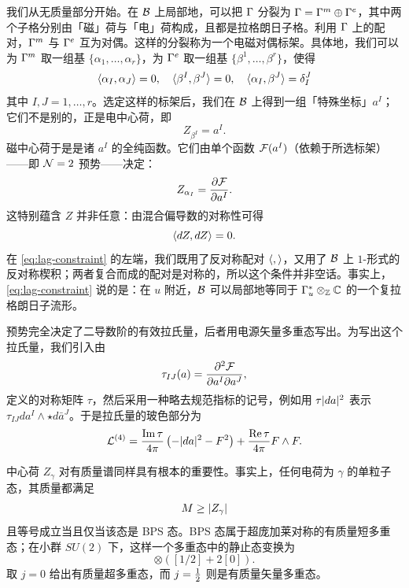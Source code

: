 我们从无质量部分开始。在 $\mathcal{B}$ 上局部地，可以把 $\Gamma$ 分裂为 $\Gamma = \Gamma^m \oplus \Gamma^e$，其中两个子格分别由「磁」荷与「电」荷构成，且都是拉格朗日子格。利用 $\Gamma$ 上的配对，$\Gamma^m$ 与 $\Gamma^e$ 互为对偶。这样的分裂称为一个电磁对偶标架。具体地，我们可以为 $\Gamma^m$ 取一组基 $\{\alpha_1, \dots, \alpha_r\}$，为 $\Gamma^e$ 取一组基 $\{\beta^1, \dots, \beta^r\}$，使得
\begin{equation}
\langle \alpha_I, \alpha_J \rangle = 0, \quad \langle \beta^I, \beta^J \rangle = 0, \quad \langle \alpha_I, \beta^J \rangle = \delta_I^J
\end{equation}
其中 $I, J = 1, \dots, r$。选定这样的标架后，我们在 $\mathcal{B}$ 上得到一组「特殊坐标」$a^I$；它们不是别的，正是电中心荷，即
\begin{equation} \label{eq:special-coords}
Z_{\beta^I} = a^I.
\end{equation}
磁中心荷于是是诸 $a^I$ 的全纯函数。它们由单个函数 $\mathcal{F}(a^I)$（依赖于所选标架）——即 $\mathcal{N}=2$ 预势——决定：
\begin{equation} \label{eq:prepot}
Z_{\alpha_I} = \frac{\partial \mathcal{F}}{\partial a^I}.
\end{equation}
这特别蕴含 $Z$ 并非任意：由混合偏导数的对称性可得
\begin{equation} \label{eq:lag-constraint}
\langle dZ, dZ \rangle = 0.
\end{equation}
在 \eqref{eq:lag-constraint} 的左端，我们既用了反对称配对 $\langle , \rangle$，又用了 $\mathcal{B}$ 上 $1$-形式的反对称楔积；两者复合而成的配对是对称的，所以这个条件并非空话。事实上，\eqref{eq:lag-constraint} 说的是：在 $u$ 附近，$\mathcal{B}$ 可以局部地等同于 $\Gamma^*_u \otimes_{\mathbb{Z}} \mathbb{C}$ 的一个复拉格朗日子流形。

预势完全决定了二导数阶的有效拉氏量，后者用电源矢量多重态写出。为写出这个拉氏量，我们引入由
\begin{equation}
\tau_{IJ}(a) = \frac{\partial^2 \mathcal{F}}{\partial a^I \partial a^J},
\end{equation}
定义的对称矩阵 $\tau$，然后采用一种略去规范指标的记号，例如用 $\tau \lvert da \rvert^2$ 表示 $\tau_{IJ} da^{I} \wedge \star d\bar{a}^J$。于是拉氏量的玻色部分为
\begin{equation} \label{eq:sw-lagrangian}
\mathcal{L}^{(4)} = \frac{\operatorname{Im} \tau}{4\pi} \left(- \lvert da \rvert^2 - F^2 \right) + \frac{\operatorname{Re} \tau}{4\pi} F \wedge F.
\end{equation}

中心荷 $Z_\gamma$ 对有质量谱同样具有根本的重要性。事实上，任何电荷为 $\gamma$ 的单粒子态，其质量都满足
\begin{equation} \label{eq:bps-bound}
M \ge \lvert Z_\gamma \rvert
\end{equation}
且等号成立当且仅当该态是 BPS 态。BPS 态属于超庞加莱对称的有质量短多重态；在小群 $SU(2)$ 下，这样一个多重态中的静止态变换为
\begin{equation}
[j] \otimes \left(\left[1/2\right] + 2[0]\right).
\end{equation}
取 $j=0$ 给出有质量超多重态，而 $j = \tfrac{1}{2}$ 则是有质量矢量多重态。

